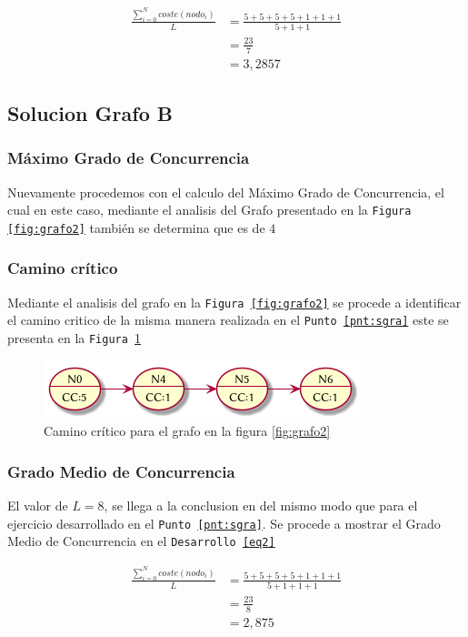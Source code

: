\documentclass{article}
\begin{document}
\begin{equation} \label{eq1}
\begin{split}
\frac{\sum_{i=0}^{N} coste(nodo_{i})}{L} & =  \frac{5 + 5 + 5 + 5 + 1 + 1 + 1}{5 + 1 + 1} \\
 & = \frac{23}{7} \\
 & = 3,2857
\end{split}
\end{equation}

\subsection{Solucion Grafo B}
\subsubsection{M\'aximo Grado de Concurrencia}
Nuevamente procedemos con el calculo del M\'aximo Grado de Concurrencia, el cual en este
caso, mediante el analisis del Grafo presentado en la \texttt{Figura
\ref{fig:grafo2}} tambi\'en se determina que es de $4$

\subsubsection{Camino cr\'itico}
Mediante el analisis del grafo en la \texttt{Figura
\ref{fig:grafo2}} se procede a identificar el camino critico de la misma manera
realizada en el \texttt{Punto \ref{pnt:sgra}} este se presenta en la
\texttt{Figura \ref{fig:cc2}}
\begin{figure}[H]
  \centering
  \includegraphics[width=.4\linewidth]{grafo2_cc}
  \caption{Camino cr\'itico para el grafo en la figura \ref{fig:grafo2}}
  \label{fig:cc2}
\end{figure}

\subsubsection{Grado Medio de Concurrencia}
El valor de $L=8$, se llega a la conclusion en del mismo modo que para el
ejercicio desarrollado en el \texttt{Punto \ref{pnt:sgra}}. Se procede a mostrar
el Grado Medio de Concurrencia en el \texttt{Desarrollo \ref{eq2}}

\begin{equation} \label{eq2}
\begin{split}
\frac{\sum_{i=0}^{N} coste(nodo_{i})}{L} & =  \frac{5 + 5 + 5 + 5 + 1 + 1 +
1}{5 + 1 + 1 + 1} \\
 & = \frac{23}{8} \\
 & = 2,875
\end{split}
\end{equation}
\end{document}
